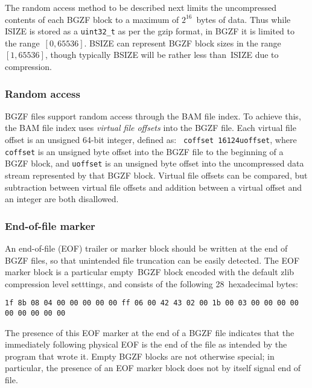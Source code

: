 \documentclass[10pt]{article}
\begin{document}
The random access method to be described next limits the uncompressed
contents of each BGZF block to a maximum of $2^{16}$~bytes of data.
Thus while {\sf ISIZE} is stored as a {\tt uint32\_t} as per the gzip format,
in BGZF it is limited to the range~$[0,65536]$.
{\sf BSIZE} can represent BGZF block sizes in the range~$[1,65536]$, though
typically {\sf BSIZE} will be rather less than~{\sf ISIZE} due to compression.

\subsubsection{Random access}

BGZF files support random access through the BAM file index. To achieve
this, the BAM file index uses \emph{virtual file offsets} into the BGZF
file. Each virtual file offset is an unsigned 64-bit integer, defined as: {\tt
  coffset 16\char124uoffset}, where {\tt coffset} is an
unsigned byte offset into the BGZF file to the beginning of a BGZF
block, and {\tt uoffset} is an unsigned byte offset into the
uncompressed data stream represented by that BGZF block. Virtual file
offsets can be compared, but subtraction between virtual file offsets
and addition between a virtual offset and an integer are both
disallowed.

\subsubsection{End-of-file marker}

An end-of-file (EOF) trailer or marker block should be written at the end
of BGZF files, so that unintended file truncation can be easily detected.
The EOF marker block is a particular empty\footnotemark\ BGZF block
encoded with the default {\sf zlib} compression level setttings,
and consists of the following 28~hexadecimal bytes:
\begin{center}
\texttt{1f 8b 08 04 00 00 00 00 00 ff 06 00 42 43 02 00 1b 00 03 00 00 00 00 00 00 00 00 00}
\end{center}


\noindent
The presence of this EOF marker at the end of a BGZF file indicates that the
immediately following physical EOF is the end of the file as intended by the
program that wrote it.
Empty BGZF blocks are not otherwise special; in particular, the presence of
an EOF marker block does not by itself signal end of file.\footnotemark
\end{document}
